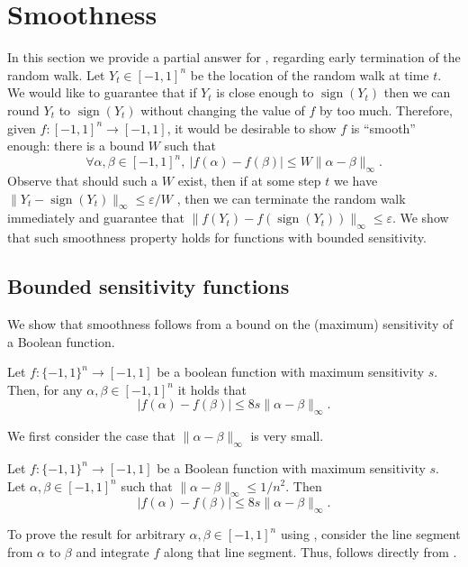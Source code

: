 \documentclass{toc}
\newcommand{\eps}{\varepsilon}
\DeclareMathOperator{\sign}{sign}     %
\begin{document}
\section{Smoothness}
\label{section:smoothness}
In this section we provide a partial answer for
, regarding early termination of the random walk. Let $Y_t \in [-1,1]^n$ be the location of the random walk at time $t$. We would like to guarantee that if  $Y_t$ is close enough to $\sign(Y_t)$ then we can round $Y_t$ to $\sign(Y_t)$ without changing the value of $f$ by too much. Therefore, given $f:[-1,1]^n\to [-1,1]$, it would be desirable to show $f$ is ``smooth'' enough: there is a bound $W$ such that
$$
\forall \alpha,\beta \in [-1,1]^n, \ |f(\alpha)-f(\beta)| \le W \|\alpha-\beta\|_\infty.
$$
Observe that should such a $W$ exist, then if at some step $t$ we have $\|Y_t-\sign(Y_t)\|_\infty\leq \eps/W$ ,  then we can terminate the random walk immediately and guarantee that $\|f(Y_t)-f(\sign(Y_t))\|_\infty\leq \eps$.
We show that such smoothness property holds for functions with bounded sensitivity.


\subsection{Bounded sensitivity functions}

We show that smoothness follows from a bound on the (maximum) sensitivity of a Boolean function.

\begin{lemma}
\label{lemma:sensitivity_smoothness}
Let $f:\{-1,1\}^n\to [-1,1]$ be a boolean function with maximum sensitivity $s$. Then, for any $\alpha,\beta\in [-1,1]^n$ it holds that
$$
|f(\alpha) - f(\beta) | \leq 8s \|\alpha -\beta\|_\infty.
$$
\end{lemma}

We first consider the case that $\|\alpha-\beta\|_\infty$ is very small.
\begin{claim}
\label{claim:small_distance}
Let $f:\{-1,1\}^n\to [-1,1]$ be a Boolean function with maximum sensitivity $s$. 
Let $\alpha,\beta\in [-1,1]^n$ such that $\|\alpha-\beta\|_\infty \leq 1/n^2$. Then
$$
|f(\alpha) - f(\beta) | \leq 8s \|\alpha -\beta\|_\infty.
$$
\end{claim}


To prove the result for arbitrary $\alpha,\beta\in [-1,1]^n$ using , consider the line segment from $\alpha$ to $\beta$ and integrate $f$ along that line segment. Thus,  follows directly from .
\end{document}
